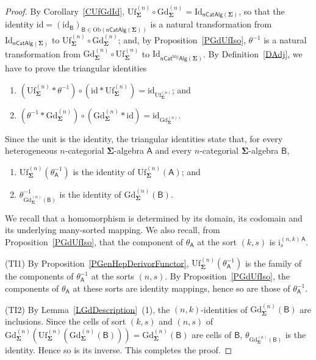 \documentclass[a4paper, reqno]{amsbook}
\newcommand{\sig}[1]{\mathbf{#1}}             %
\newcommand{\calg}[1]{\boldsymbol{\mathsf{#1}}} %
\newcommand{\htg}{\mathrm{htg}}                %
\newcommand{\id}{\mathrm{id}}
\newcommand{\Id}{\mathrm{Id}}
\newcommand{\Gd}{\mathrm{Gd}}
\newcommand{\Uf}{\mathrm{Uf}}
\theoremstyle{plain}
\theoremstyle{definition}
\begin{document}
\begin{proof}
By Corollary~\ref{CUfGdId}, $\Uf^{(n)}_{\sig{\Sigma}}\circ\Gd^{(n)}_{\sig{\Sigma}}=\Id_{\mathsf{nCatAlg}(\sig{\Sigma})}$, so that the identity $\id=(\id_{\calg{B}})_{\calg{B}\in\mathrm{Ob}(\mathsf{nCatAlg}(\sig{\Sigma}))}$ is a natural transformation from $\Id_{\mathsf{nCatAlg}(\sig{\Sigma})}$ to $\Uf^{(n)}_{\sig{\Sigma}}\circ\Gd^{(n)}_{\sig{\Sigma}}$; and, by Proposition~\ref{PGdUfIso}, $\theta^{-1}$ is a natural transformation from $\Gd^{(n)}_{\sig{\Sigma}}\circ\Uf^{(n)}_{\sig{\Sigma}}$ to $\Id_{\mathsf{nCat}^{\htg}\mathsf{Alg}(\sig{\Sigma})}$.
By Definition~\ref{DAdj}, we have to prove the triangular identities
\begin{enumerate}
	\item[(TI1)]
	$\left(\Uf^{(n)}_{\sig{\Sigma}}\ast\theta^{-1}\right)\circ\left(\id\ast\Uf^{(n)}_{\sig{\Sigma}}\right)=\id_{\Uf^{(n)}_{\sig{\Sigma}}}$; and

	\item[(TI2)]
	$\left(\theta^{-1}\ast\Gd^{(n)}_{\sig{\Sigma}}\right)\circ\left(\Gd^{(n)}_{\sig{\Sigma}}\ast\id\right)=\id_{\Gd^{(n)}_{\sig{\Sigma}}}$.
\end{enumerate}
Since the unit is the identity, the triangular identities state that, for every heterogeneous $n$-categorial $\sig{\Sigma}$-algebra $\calg{A}$ and every $n$-categorial $\sig{\Sigma}$-algebra $\calg{B}$,
\begin{enumerate}
	\item[(TI1)]
	$\Uf^{(n)}_{\sig{\Sigma}}(\theta^{-1}_{\calg{A}})$ is the identity of $\Uf^{(n)}_{\sig{\Sigma}}(\calg{A})$; and

	\item[(TI2)]
	$\theta^{-1}_{\Gd^{(n)}_{\sig{\Sigma}}(\calg{B})}$ is the identity of $\Gd^{(n)}_{\sig{\Sigma}}(\calg{B})$.
\end{enumerate}
We recall that a homomorphism is determined by its domain, its codomain and its underlying many-sorted mapping.
We also recall, from Proposition~\ref{PGdUfIso}, that the component of $\theta_{\calg{A}}$ at the sort $(k,s)$ is $\mathrm{i}^{(n,k)\,\calg{A}}_{s}$.

(TI1) By Proposition~\ref{PGenHepDerivorFunctor}, $\Uf^{(n)}_{\sig{\Sigma}}(\theta^{-1}_{\calg{A}})$ is the family of the components of $\theta^{-1}_{\calg{A}}$ at the sorts $(n,s)$.
By Proposition~\ref{PGdUfIso}, the components of $\theta_{\calg{A}}$ at these sorts are identity mappings, hence so are those of $\theta^{-1}_{\calg{A}}$.

(TI2) By Lemma~\ref{LGdDescription}~(1), the $(n,k)$-identities of $\Gd^{(n)}_{\sig{\Sigma}}(\calg{B})$ are inclusions.
Since the cells of sort $(k,s)$ and $(n,s)$ of $\Gd^{(n)}_{\sig{\Sigma}}(\Uf^{(n)}_{\sig{\Sigma}}(\Gd^{(n)}_{\sig{\Sigma}}(\calg{B})))=\Gd^{(n)}_{\sig{\Sigma}}(\calg{B})$ are cells of $\calg{B}$, $\theta_{\Gd^{(n)}_{\sig{\Sigma}}(\calg{B})}$ is the identity.
Hence so is its inverse. This completes the proof.
\end{proof}
\end{document}
